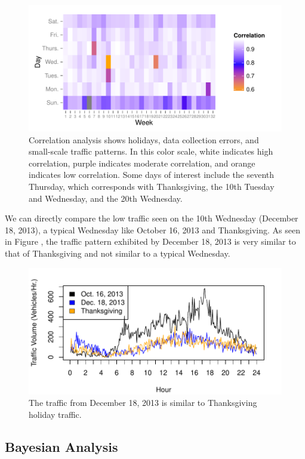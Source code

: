 \documentclass{report}
\begin{document}
\begin{figure}[h]
\centering
\includegraphics{upstat_report-006}
\caption{Correlation analysis shows holidays, data collection errors, and small-scale
traffic patterns. In this color scale, white indicates high correlation, purple
indicates moderate correlation, and orange indicates low correlation. Some days of
interest include the seventh Thursday, which corresponds with Thanksgiving, the
10th Tuesday and Wednesday, and the 20th Wednesday.}
\label{fig:correlation}
\end{figure}

We can directly compare the low traffic seen on the 10th Wednesday
(December 18, 2013), a typical Wednesday like October 16, 2013 and Thanksgiving.
As seen in Figure \label{fig:wednesday}, the traffic pattern exhibited by December
18, 2013 is very similar to that of Thanksgiving and not similar to a typical
Wednesday.

\begin{figure}[H]
\centering
\includegraphics{upstat_report-007}
\caption{The traffic from December 18, 2013 is similar to Thanksgiving holiday traffic.}
\label{fig:wednesday}
\end{figure}

\subsection*{Bayesian Analysis}
\end{document}
